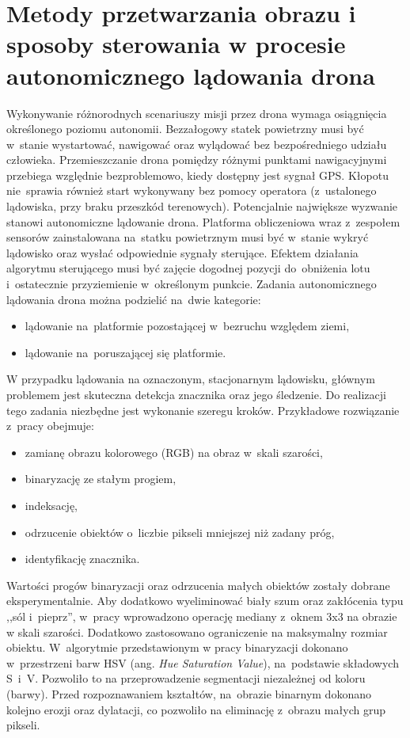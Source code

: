 \chapter{Metody przetwarzania obrazu i sposoby sterowania w procesie autonomicznego lądowania drona}
\label{cha:metody}

Wykonywanie różnorodnych scenariuszy misji przez drona wymaga osiągnięcia określonego poziomu autonomii. Bezzałogowy statek powietrzny musi być w~stanie wystartować, nawigować oraz wylądować bez bezpośredniego udziału człowieka. 
Przemieszczanie drona pomiędzy różnymi punktami nawigacyjnymi przebiega względnie bezproblemowo, kiedy dostępny jest sygnał GPS. 
Kłopotu nie~sprawia również start wykonywany bez pomocy operatora (z~ustalonego lądowiska, przy braku przeszkód terenowych). 
Potencjalnie największe wyzwanie stanowi autonomiczne lądowanie drona. 
Platforma obliczeniowa wraz z~zespołem sensorów zainstalowana na~statku powietrznym musi być w~stanie wykryć lądowisko oraz wysłać odpowiednie sygnały sterujące. 
Efektem działania algorytmu sterującego musi być zajęcie dogodnej pozycji do~obniżenia lotu i~ostatecznie przyziemienie w~określonym punkcie. 
Zadania autonomicznego lądowania drona można podzielić na~dwie kategorie:  
\begin{itemize}
	\item lądowanie na~platformie pozostającej w~bezruchu względem ziemi,
	\item lądowanie na~poruszającej się platformie.
\end{itemize}

W przypadku lądowania na oznaczonym, stacjonarnym lądowisku, głównym problemem jest skuteczna detekcja znacznika oraz jego śledzenie. 
Do realizacji tego zadania niezbędne jest wykonanie szeregu kroków.
Przykładowe rozwiązanie z~pracy \cite{Rings} obejmuje:
\begin{itemize}
	\item zamianę obrazu kolorowego (RGB) na obraz w~skali szarości,
	\item binaryzację ze stałym progiem,
	\item indeksację,
	\item odrzucenie obiektów o~liczbie pikseli mniejszej niż zadany próg,
	\item identyfikację znacznika.
\end{itemize}

Wartości progów binaryzacji oraz odrzucenia małych obiektów zostały dobrane eksperymentalnie. 
Aby dodatkowo wyeliminować biały szum oraz zakłócenia typu ,,sól i~pieprz'', w~pracy \cite{H_median} wprowadzono operację mediany z~oknem 3x3 na obrazie w skali szarości. 
Dodatkowo zastosowano ograniczenie na maksymalny rozmiar obiektu. 
W~algorytmie przedstawionym w pracy \cite{FPGA} binaryzacji dokonano w~przestrzeni barw HSV (ang. \textit{Hue Saturation Value}), na~podstawie składowych S~i~V. 
Pozwoliło to na przeprowadzenie segmentacji niezależnej od koloru (barwy). 
Przed rozpoznawaniem kształtów, na~obrazie binarnym dokonano kolejno erozji oraz dylatacji, co  pozwoliło na eliminację z~obrazu małych grup pikseli. \par 

